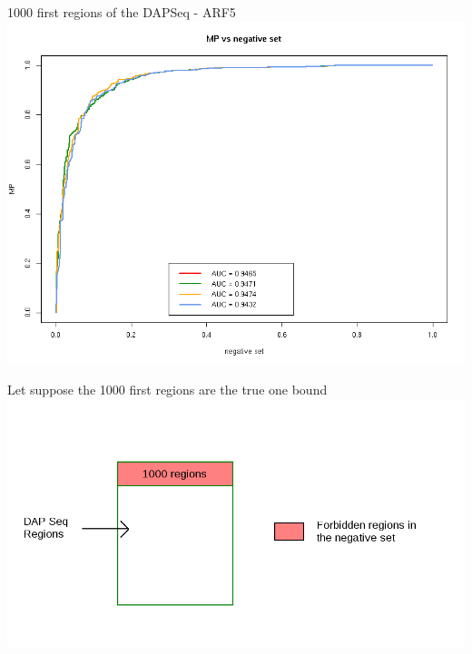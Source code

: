 \documentclass{beamer}
\begin{document}
\begin{frame}{1000 first regions of the DAPSeq - ARF5}
  \includegraphics[width=1\textwidth,height=0.8\textheight,center]{ROC_MP_negative_set_all_regions.png}
\end{frame}

\begin{frame}{Let suppose the 1000 first regions are the true one bound}
  \includegraphics[width=1\textwidth,height=0.8\textheight,center]{negative_set_1000_regions.png}
\end{frame}
\end{document}
